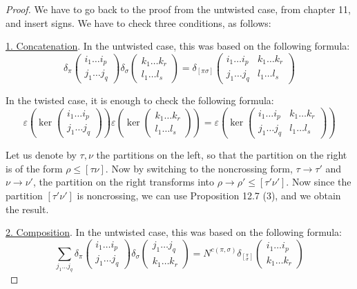 \documentclass[12pt]{amsbook}
\begin{document}
\begin{proof}
We have to go back to the proof from the untwisted case, from chapter 11, and insert signs. We have to check three conditions, as follows:

\medskip

\underline{1. Concatenation}. In the untwisted case, this was based on the following formula:
$$\delta_\pi\begin{pmatrix}i_1\ldots i_p\\ j_1\ldots j_q\end{pmatrix}
\delta_\sigma\begin{pmatrix}k_1\ldots k_r\\ l_1\ldots l_s\end{pmatrix}
=\delta_{[\pi\sigma]}\begin{pmatrix}i_1\ldots i_p&k_1\ldots k_r\\ j_1\ldots j_q&l_1\ldots l_s\end{pmatrix}$$

In the twisted case, it is enough to check the following formula:
$$\varepsilon\left(\ker\begin{pmatrix}i_1\ldots i_p\\ j_1\ldots j_q\end{pmatrix}\right)
\varepsilon\left(\ker\begin{pmatrix}k_1\ldots k_r\\ l_1\ldots l_s\end{pmatrix}\right)=
\varepsilon\left(\ker\begin{pmatrix}i_1\ldots i_p&k_1\ldots k_r\\ j_1\ldots j_q&l_1\ldots l_s\end{pmatrix}\right)$$

Let us denote by $\tau,\nu$ the partitions on the left, so that the partition on the right is of the form $\rho\leq[\tau\nu]$. Now by switching to the noncrossing form, $\tau\to\tau'$ and $\nu\to\nu'$, the partition on the right transforms into $\rho\to\rho'\leq[\tau'\nu']$. Now since the partition $[\tau'\nu']$ is noncrossing, we can use Proposition 12.7 (3), and we obtain the result.

\medskip

\underline{2. Composition}. In the untwisted case, this was based on the following formula:
$$\sum_{j_1\ldots j_q}\delta_\pi\begin{pmatrix}i_1\ldots i_p\\ j_1\ldots j_q\end{pmatrix}
\delta_\sigma\begin{pmatrix}j_1\ldots j_q\\ k_1\ldots k_r\end{pmatrix}
=N^{c(\pi,\sigma)}\delta_{[^\pi_\sigma]}\begin{pmatrix}i_1\ldots i_p\\ k_1\ldots k_r\end{pmatrix}$$


\end{proof}
\end{document}
